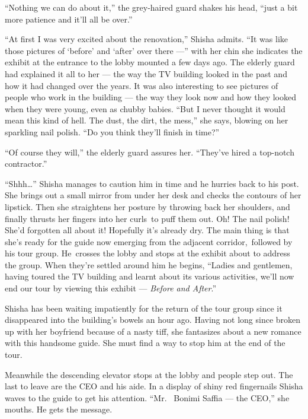 \documentclass[twoside,11pt]{book}
\begin{document}
``Nothing we can do about it,'' the grey-haired guard shakes his head, ``just a
bit more patience and it'll all be over.''

``At first I was very excited about the renovation,'' Shisha admits. ``It was
like those pictures of `before' and `after' over there ---'' with her chin she indicates the exhibit at the
entrance to the lobby mounted a few days ago. The elderly guard had explained it all to her --- the way the TV building
looked in the past and how it had changed over the years. It was also interesting to see pictures of people who work in
the building --- the way they look now and how they looked when they were young, even as chubby babies.
``But I never thought it would mean this kind of hell. The dust, the dirt, the mess,'' she
says, blowing on her sparkling nail polish. ``Do you think they'll finish in time?''

``Of course they will,'' the elderly guard assures her. ``They've hired a
top-notch contractor.''

``Shhh{\ldots}'' Shisha manages to caution him in time and he hurries back to his post. She
brings out a small mirror from under her desk and checks the contours of her lipstick. Then she straightens her posture
by{ }throwing back her shoulders, and finally thrusts her fingers into her curls~to puff them out. Oh!
The nail polish! She'd forgotten all about it! Hopefully it's already dry. The main thing is that she's ready for the
guide now emerging from the adjacent corridor,~followed by his tour group. He~crosses the lobby and stops at the
exhibit about to address the group. When they're settled around him he begins, ``Ladies and gentlemen,
having toured the TV building and learnt about its various activities, we'll now end our tour by viewing this exhibit --- \textit{Before and After}.''

Shisha has been waiting impatiently for the return of the tour group since it disappeared into the building's bowels an
hour ago. Having not long since broken up with her boyfriend because of a nasty tiff, she fantasizes about a new
romance with this handsome guide. She must find a way to stop him at the end of the tour.

Meanwhile the descending elevator stops at the lobby and people step out. The last to leave are the CEO and his aide. In
a display of shiny red fingernails Shisha waves to the guide to get his attention. ``Mr. ~Bonimi Saffia ---
the CEO,'' she mouths. He gets the message.
\end{document}
